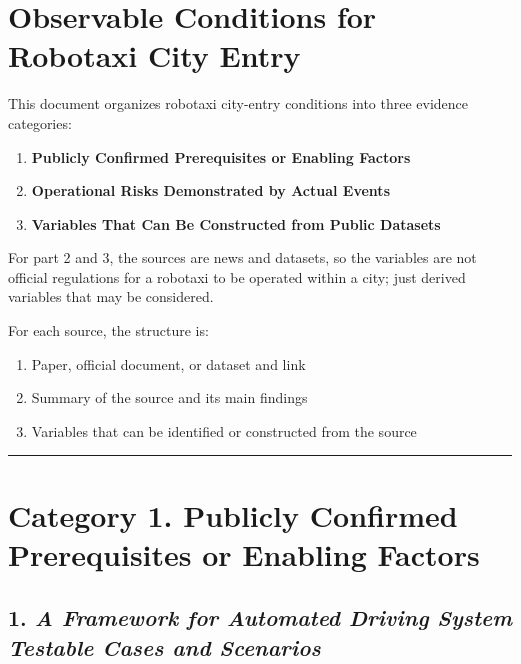 \documentclass[10pt,a4paper]{article}
\providecommand{\tightlist}{\setlength{\itemsep}{0pt}\setlength{\parskip}{0pt}}
\begin{document}
\hypertarget{observable-conditions-for-robotaxi-city-entry}{%
\section{Observable Conditions for Robotaxi City Entry}\label{observable-conditions-for-robotaxi-city-entry}}

This document organizes robotaxi city-entry conditions into three evidence categories:

\begin{enumerate}
\def\labelenumi{\arabic{enumi}.}
\tightlist
\item
  \textbf{Publicly Confirmed Prerequisites or Enabling Factors}
\item
  \textbf{Operational Risks Demonstrated by Actual Events}
\item
  \textbf{Variables That Can Be Constructed from Public Datasets}
\end{enumerate}

For part 2 and 3, the sources are news and datasets, so the variables are not official regulations for a robotaxi to be operated within a city; just derived variables that may be considered.

For each source, the structure is:

\begin{enumerate}
\def\labelenumi{\arabic{enumi}.}
\tightlist
\item
  Paper, official document, or dataset and link\\
\item
  Summary of the source and its main findings\\
\item
  Variables that can be identified or constructed from the source
\end{enumerate}

\begin{center}\rule{0.5\linewidth}{0.5pt}\end{center}

\hypertarget{category-1.-publicly-confirmed-prerequisites-or-enabling-factors}{%
\section{Category 1. Publicly Confirmed Prerequisites or Enabling Factors}\label{category-1.-publicly-confirmed-prerequisites-or-enabling-factors}}

\hypertarget{a-framework-for-automated-driving-system-testable-cases-and-scenarios}{%
\subsection{\texorpdfstring{1. \emph{A Framework for Automated Driving System Testable Cases and Scenarios}}{1. A Framework for Automated Driving System Testable Cases and Scenarios}}\label{a-framework-for-automated-driving-system-testable-cases-and-scenarios}}
\end{document}
